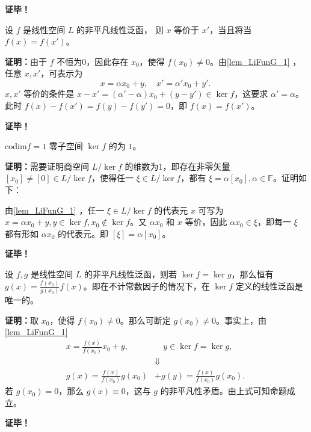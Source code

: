 \textbf{证毕！}

\begin{corollary}{}
设 $f$ 是线性空间 $L$ 的非平凡线性泛函， 则 $x$ 等价于 $x'$，当且将当 $f(x)=f(x')$。
\end{corollary}
\textbf{证明：}由于 $f$ 不恒为0，因此存在 $x_0$，使得 $f(x_0)\neq0$。由\autoref{lem_LiFunG_1} ，任意 $x,x'$，可表示为
\begin{equation}
x=\alpha x_0+y,\quad x'=\alpha' x_0+y'.~
\end{equation}
$x,x'$ 等价的条件是 $x-x'=(\alpha'-\alpha)x_0+(y-y')\in \ker f$，这要求 $\alpha'=\alpha$。此时 $f(x)-f(x')=f(y)-f(y')=0$，即 $f(x)=f(x')$。

\textbf{证毕！}


\begin{corollary}{ $\mathrm{codim} f=1$ }
零子空间 $\ker f$ 的为 $1$。
\end{corollary}

\textbf{证明：}需要证明商空间 $L/\ker f$ 的维数为1，即存在非零矢量 $[x_0]\neq [0]\in L/\ker f$，使得任一 $\xi\in L/\ker f$，都有 $\xi=\alpha[x_0],\alpha\in\mathbb F$。证明如下：

由\autoref{lem_LiFunG_1} ，任一 $\xi\in L/\ker f$ 的代表元 $x$ 可写为 $x=\alpha x_0+y,y\in\ker f,x_0\notin\ker f$。又 $\alpha x_0$ 和 $x$ 等价，因此 $\alpha x_0\in \xi$，即每一 $\xi$ 都有形如 $\alpha x_0$ 的代表元。即 $[\xi]=\alpha[x_0]$。 

\textbf{证毕！}







\begin{theorem}{}
设 $f,g$ 是线性空间 $L$ 的非平凡线性泛函，则若 $\ker f=\ker g$，那么恒有 $g(x)=\frac{f(x_0)}{g(x_0)}f(x)$。即在不计常数因子的情况下，在 $\ker f$ 定义的线性泛函是唯一的。 
\end{theorem}
\textbf{证明：}取 $x_0$，使得 $f(x_0)\neq0$。那么可断定 $g(x_0)\neq0$。事实上，由\autoref{lem_LiFunG_1} 
\begin{equation}
\begin{aligned}
x=\frac{f(x)}{f(x_0)}x_0+y,&\quad y\in\ker f=\ker g,\\
&\Downarrow\\
g(x)=\frac{f(x)}{f(x_0)}g(x_0)&+g(y)=\frac{f(x)}{f(x_0)}g(x_0).
\end{aligned}~
\end{equation}
若 $g(x_0)=0$，那么 $g(x)\equiv0$，这与 $g$ 的非平凡性矛盾。由上式可知命题成立。

\textbf{证毕！}







